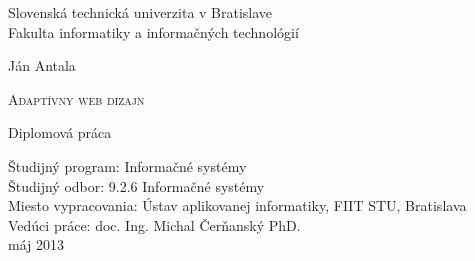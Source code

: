 

\setlength{\parindent}{0cm}

\thispagestyle{empty}

\begin{center}
\begin{LARGE}
\textmd{
Slovenská technická univerzita v Bratislave\\
\vspace*{0.2cm}
Fakulta informatiky a informačných technológií  
}
\end{LARGE}

\vspace*{1.0cm}
\begin{Large}
\end{Large}

\end{center}

\vspace{5.5cm}

\begin{center}
{\Large \textmd{{Ján Antala}}}
\end{center}

\vspace{0.1cm}
\begin{huge}
\begin{center}
\textsc{Adaptívny web dizajn}
\end{center}
\end{huge}

\vspace{0.5cm}
\begin{center}
{\Large{\textmd{Diplomová práca}}}\\
\end{center}

\vspace{5.5cm}

\begin{flushleft}
\large{Študijný program: Informačné systémy} \\
\large{Študijný odbor: 9.2.6 Informačné systémy} \\
\large{Miesto vypracovania:  Ústav aplikovanej informatiky, FIIT STU, Bratislava} \\
\large{Vedúci práce: doc. Ing. Michal Čerňanský PhD.} \\
\vspace{1.0cm}
\large{máj 2013} \\
\end{flushleft}


